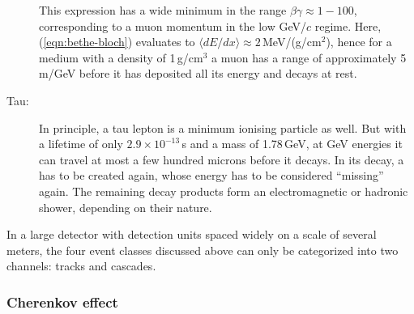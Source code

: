 \begin{description}
  This expression has a wide minimum in the range $\beta\gamma\approx 1 - 100$, 
  corresponding to a muon momentum in the low GeV/$c$ regime. Here,
  (\ref{eqn:bethe-bloch}) evaluates to $\langle dE/dx\rangle \approx
  2$\,MeV/(g/cm$^2$), hence for a medium with a density of 1\,g/cm$^3$ a muon
  has a range of approximately 5\,m/GeV before it has deposited all its energy
  and decays at rest.
 \item[Tau:] In principle, a tau lepton is a minimum ionising particle as well.
  But with a lifetime of only $2.9\times10^{-13}$\,s and a mass of 1.78\,GeV, at
  GeV energies it can travel at most a few hundred microns before it decays. In
  its decay, a \nutau has to be created again, whose energy has to be considered
  ``missing'' again. The remaining decay products form an electromagnetic or
  hadronic shower, depending on their nature.
\end{description}

In a large detector with detection units spaced widely on a scale of several 
meters, the four event classes discussed above can only be categorized into two 
channels: tracks and cascades.


\subsubsection{Cherenkov effect}